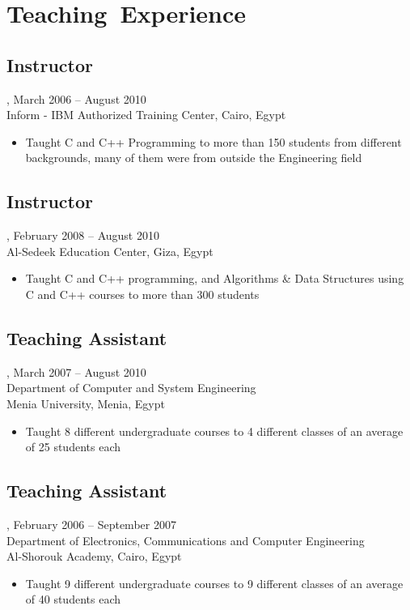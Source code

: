 \section{Teaching~Experience}
\subsection{Instructor}, March 2006 -- August 2010\\
Inform - IBM Authorized Training Center, Cairo, Egypt
\begin{itemize}
\item Taught C and C++ Programming to more than 150 students from different backgrounds, many of them were from outside the Engineering field
\end{itemize}

\subsection{Instructor}, February 2008 -- August 2010\\
Al-Sedeek Education Center, Giza, Egypt
\begin{itemize}
\item Taught C and C++ programming, and Algorithms \& Data Structures using C and C++ courses to more than 300 students
\end{itemize}

\subsection{Teaching Assistant}, March 2007 -- August 2010\\
Department of Computer and System Engineering\\
Menia University, Menia, Egypt
\begin{itemize}
\item Taught 8 different undergraduate courses to 4 different classes of an average of 25 students each
\end{itemize}

\subsection{Teaching Assistant}, February 2006 -- September 2007\\
Department of Electronics, Communications and Computer Engineering\\
Al-Shorouk Academy, Cairo, Egypt
\begin{itemize}
\item Taught 9 different undergraduate courses to 9 different classes of an average of 40 students each
\end{itemize}

